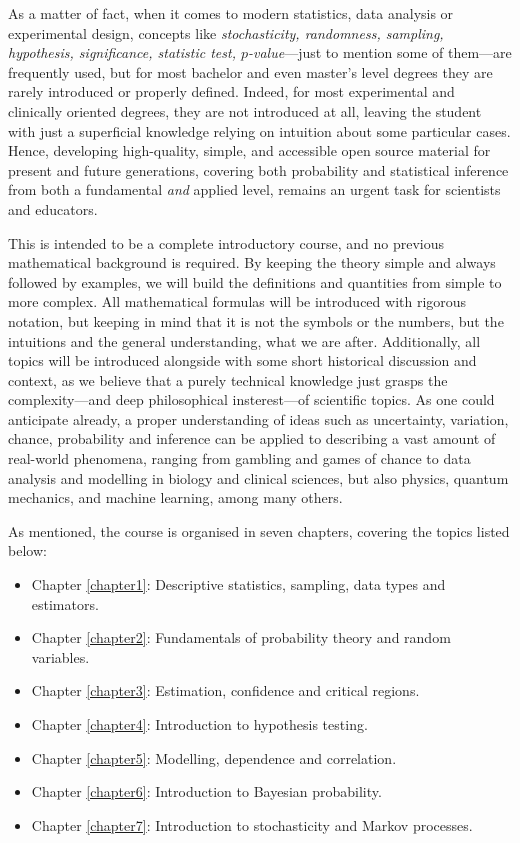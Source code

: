 As a matter of fact, when it comes to modern statistics, data analysis or experimental design, concepts like \textit{stochasticity, randomness, sampling, hypothesis, significance, statistic test, \(p\)-value}—just to mention some of them—are frequently used, but for most bachelor and even master's level degrees they are rarely introduced or properly defined. Indeed, for most experimental and clinically oriented degrees, they are not introduced at all, leaving the student with just a superficial knowledge relying on intuition about some particular cases. Hence, developing high-quality, simple, and accessible open source material for present and future generations, covering both probability and statistical inference from both a fundamental \textit{and} applied level, remains an urgent task for scientists and educators.

\medskip

This is intended to be a complete introductory course, and no previous mathematical background is required. By keeping the theory simple and always followed by examples, we will build the definitions and quantities from simple to more complex. All mathematical formulas will be introduced with rigorous notation, but keeping in mind that it is not the symbols or the numbers, but the intuitions and the general understanding, what we are after. Additionally, all topics will be introduced alongside with some short historical discussion and context, as we believe that a purely technical knowledge just grasps the complexity—and deep philosophical insterest—of scientific topics. As one could anticipate already, a proper understanding of ideas such as uncertainty, variation, chance, probability and inference can be applied to describing a vast amount of real-world phenomena, ranging from gambling and games of chance to data analysis and modelling in biology and clinical sciences, but also physics, quantum mechanics, and machine learning, among many others.

\medskip

As mentioned, the course is organised in seven chapters, covering the topics listed below:

\begin{itemize}
    \item Chapter \ref{chapter1}: Descriptive statistics, sampling, data types and estimators.
    \item Chapter \ref{chapter2}: Fundamentals of probability theory and random variables.
    \item Chapter \ref{chapter3}: Estimation, confidence and critical regions.
    \item Chapter \ref{chapter4}: Introduction to hypothesis testing. 
    \item Chapter \ref{chapter5}: Modelling, dependence and correlation. 
    \item Chapter \ref{chapter6}: Introduction to Bayesian probability.
    \item Chapter \ref{chapter7}: Introduction to stochasticity and Markov processes.
\end{itemize}

